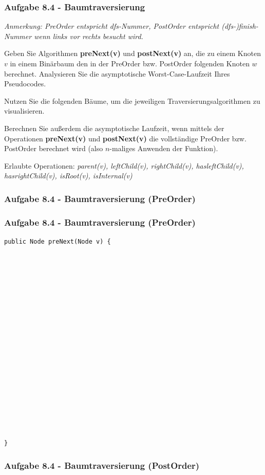\documentclass{beamer}
\begin{document}
\begin{frame}
	\frametitle{Aufgabe 8.4 - Baumtraversierung}
	\small
	\textit{Anmerkung: PreOrder entspricht dfs-Nummer, PostOrder entspricht (dfs-)finish-Nummer wenn links vor rechts besucht wird.}

	\bigskip

	Geben Sie Algorithmen \textbf{preNext(v)} und \textbf{postNext(v)} an, die zu einem Knoten $v$ in einem
	Binärbaum den in der PreOrder bzw. PostOrder folgenden Knoten $w$ berechnet. Analysieren
	Sie die asymptotische Worst-Case-Laufzeit Ihres Pseudocodes.

	\medskip

	Nutzen Sie die folgenden Bäume, um die jeweiligen Traversierungsalgorithmen zu visualisieren.

	\medskip

	Berechnen Sie außerdem die asymptotische Laufzeit, wenn mittels der Operationen \textbf{preNext(v)}
	und \textbf{postNext(v)} die vollständige PreOrder bzw. PostOrder berechnet wird (also $n$-maliges
	Anwenden der Funktion).

	\bigskip

	Erlaubte Operationen: \textit{parent(v), leftChild(v), rightChild(v), hasleftChild(v), hasrightChild(v), isRoot(v), isInternal(v)}
\end{frame}

\begin{frame}
	\frametitle{Aufgabe 8.4 - Baumtraversierung (PreOrder)}
	\begin{center}
		
	\end{center}
\end{frame}

\begin{frame}[fragile]
	\frametitle{Aufgabe 8.4 - Baumtraversierung (PreOrder)}
	\scriptsize
	\begin{verbatim}
public Node preNext(Node v) {



















}
	\end{verbatim}
\end{frame}

\begin{frame}
	\frametitle{Aufgabe 8.4 - Baumtraversierung (PostOrder)}
	\begin{center}
		
	\end{center}
\end{frame}
\end{document}
